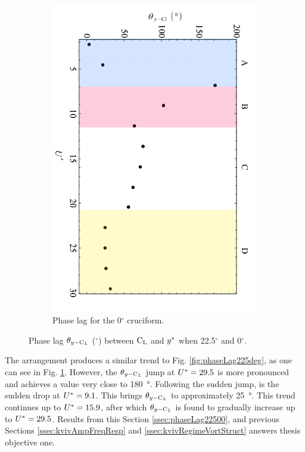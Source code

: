 \documentclass[oneside]{utmthesis}
\begin{document}
\begin{figure}[H]
  \begin{subfigure}[h]{0.9\textwidth}
    \includegraphics[angle=90,width=\textwidth]{figs/phaseLag1}
    \caption{Phase lag for the 0$^{\circ}$ cruciform.}
    \label{fig:phaseLag00deg}
  \end{subfigure}

  \caption{Phase lag $\theta_{y-\text{C}_{L}}$ ($^{\circ}$) between $\text{C}_{\text{L}}$ and $y^{*}$ when 22.5$^{\circ}$ and 0$^{\circ}$.}
  \label{fig:phaseLag22500deg}
\end{figure}

The \angon{} arrangement produces a similar trend to Fig. \ref{fig:phaseLag225deg}, as one can see in Fig. \ref{fig:phaseLag00deg}. However, the $\theta_{y-\text{C}_{L}}$ jump at  $U^{*} =29.5$ is more pronounced and achieves a value very close to \SI{180}{\degree}. Following the sudden jump, is the sudden drop at $U^{*} = 9.1$. This brings $\theta_{y-\text{C}_{L}}$ to approximately \SI{25}{\degree}. This trend continues up to $U^{*} = 15.9$, after which $\theta_{y-\text{C}_{L}}$ is found to gradually increase up to $U^{*} = 29.5$. Results from this Section \ref{ssec:phaseLag22500}, and previous Sections \ref{ssec:kvivAmpFreqResp} and \ref{ssec:kvivRegimeVortStruct} answers thesis objective one.
\end{document}
